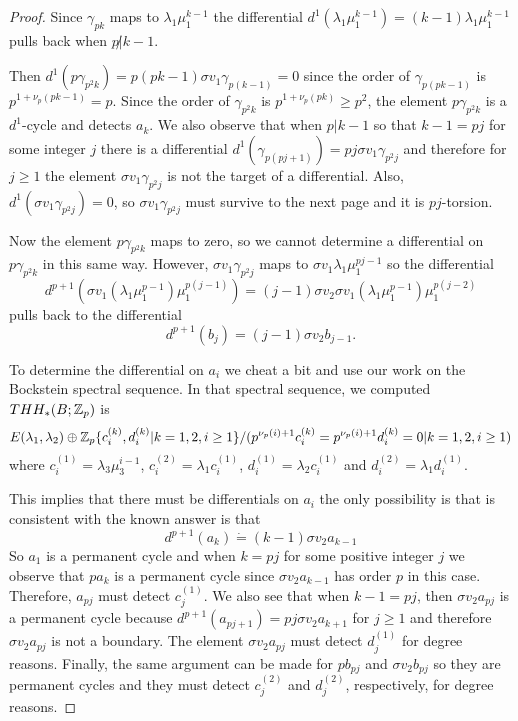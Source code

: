 \begin{proof}
Since $\gamma_{pk}$ maps to $\lambda_1\mu_1^{k-1}$ the differential $d^1(\lambda_1\mu_1^{k-1})=(k-1)\lambda_1\mu_1^{k-1}$ pulls back when $p\not | k-1$. 

Then $d^1(p\gamma_{p^2k})=p(pk-1)\sigma v_1 \gamma_{p(k-1)}=0$ since the order of $\gamma_{p(pk-1)}$ is $p^{1+\nu_{p}(pk-1)}=p$. Since the order of $\gamma_{p^2k}$ is $p^{1+\nu_p(pk)}\ge p^2$, the element $p\gamma_{p^2k}$ is a $d^1$-cycle and detects $a_k$. 
We also observe that when $p|k-1$ so that $k-1=pj$ for some integer $j$ there is a differential 
$d^1(\gamma_{p(pj+1)})=pj\sigma v_1\gamma_{p^2j}$ 
and therefore for $j\ge 1$ the element $\sigma v_1\gamma_{p^2j}$ is not the target of a differential. Also, $d^1(\sigma v_1\gamma_{p^2j})=0$, so $\sigma v_1 \gamma_{p^2j}$ must survive to the next page and it is $pj$-torsion. 

Now the element $p\gamma_{p^2k}$ maps to zero, so we cannot determine a differential on $p\gamma_{p^2k}$ in this same way. However, $\sigma v_1\gamma_{p^2j}$ maps to $\sigma v_1\lambda_1\mu_1^{pj-1}$ so the differential 
\[ d^{p+1}(\sigma v_1(\lambda_1\mu_1^{p-1})\mu_1^{p(j-1)})=(j-1)\sigma v_2\sigma v_1(\lambda_1\mu_1^{p-1})\mu_1^{p(j-2)}\]
pulls back to the differential
\[ d^{p+1}(b_j)=(j-1)\sigma v_2b_{j-1}.\]

To determine the differential on $a_i$ we cheat a bit and use our work on the Bockstein spectral sequence. In that spectral sequence, we computed $THH_*(B;\mathbb{Z}_p)$ is 
\[E(\lambda_1,\lambda_2)\oplus \mathbb{Z}_p\{c_i^{(k)},d_i^{(k)}| k=1,2, i\ge 1\}/(p^{\nu_p(i)+1}c_i^{(k)}=p^{\nu_p(i)+1}d_i^{(k)}=0| k=1,2, i\ge 1)\]
where $c_i^{(1)}=\lambda_3\mu_3^{i-1}$, $c_i^{(2)}=\lambda_1c_i^{(1)}$, $d_i^{(1)}=\lambda_2c_i^{(1)}$ and $d_i^{(2)}=\lambda_1d_i^{(1)}$. 

This implies that there must be differentials on $a_i$ the only possibility is that is consistent with the known answer is that 
\[ d^{p+1}(a_k)\dot{=}(k-1)\sigma v_2 a_{k-1}\]
So $a_1$ is a permanent cycle and when $k=pj$ for some positive integer $j$ we observe that $pa_k$ is a permanent cycle since $\sigma v_2a_{k-1}$ has order $p$ in this case. Therefore, $a_{pj}$ must detect $c_j^{(1)}$. We also see that when $k-1=pj$, then $\sigma v_2 a_{pj}$ is a permanent cycle because $d^{p+1}(a_{pj+1})=pj\sigma v_2 a_{k+1}$ for $j\ge 1$ and therefore $\sigma v_2 a_{pj}$ is not a boundary. The element $\sigma v_2a_{pj}$ must detect $d_j^{(1)}$ for degree reasons. Finally, the same argument can be made for $pb_{pj}$ and $\sigma v_2b_{pj}$ so they are permanent cycles and they must detect $c_{j}^{(2)}$ and $d_{j}^{(2)}$, respectively, for degree reasons. 
\end{proof}



